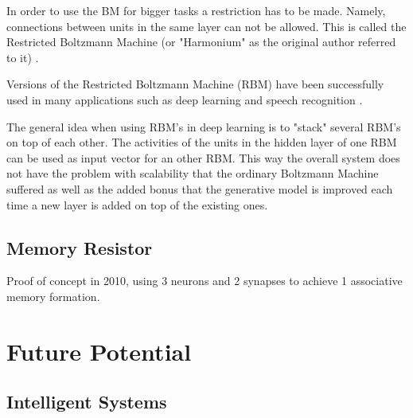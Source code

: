 \documentclass[12pt, a4paper]{article}
\begin{document}
In order to use the BM for bigger tasks a restriction has to be made. Namely, connections between units in the same layer can not be allowed. This is called the Restricted Boltzmann Machine (or "Harmonium" as the original author referred to it) \cite{smolensky1986information}.

Versions of the Restricted Boltzmann Machine (RBM) have been successfully used in many applications such as deep learning \cite{hinton2012better} and speech recognition \cite{dahl2010phone}.

The general idea when using RBM's in deep learning is to "stack" several RBM's on top of each other. The activities of the units in the hidden layer of one RBM can be used as input vector for an other RBM. This way the overall system does not have the problem with scalability that the ordinary Boltzmann Machine suffered as well as the added bonus that the generative model is improved each time a new layer is added on top of the existing ones.

\subsection{Memory Resistor}


Proof of concept in 2010, using 3 neurons and 2 synapses to achieve 1 associative memory formation.

%


\section{Future Potential}

%
%

%


\subsection{Intelligent Systems}
\end{document}
